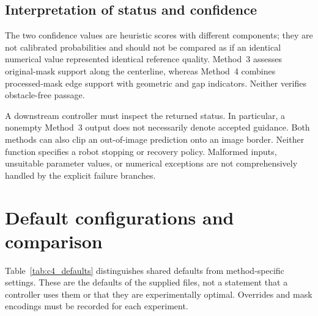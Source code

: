\subsection{Interpretation of status and confidence}
\label{subsec:c4_failures}

The two confidence values are heuristic scores with different components;
they are not calibrated probabilities and should not be compared as if
an identical numerical value represented identical reference quality.
Method~3 assesses original-mask support along the centerline, whereas
Method~4 combines processed-mask edge support with geometric and gap
indicators. Neither verifies obstacle-free passage.

A downstream controller must inspect the returned status. In particular,
a nonempty Method~3 output does not necessarily denote accepted guidance.
Both methods can also clip an out-of-image prediction onto an image
border. Neither function specifies a robot stopping or recovery policy.
Malformed inputs, unsuitable parameter values, or numerical exceptions
are not comprehensively handled by the explicit failure branches.

\section{Default configurations and comparison}
\label{sec:c4_discussion}

Table~\ref{tab:c4_defaults} distinguishes shared defaults from
method-specific settings. These are the defaults of the supplied files,
not a statement that a controller uses them or that they are
experimentally optimal. Overrides and mask encodings must be recorded
for each experiment.

